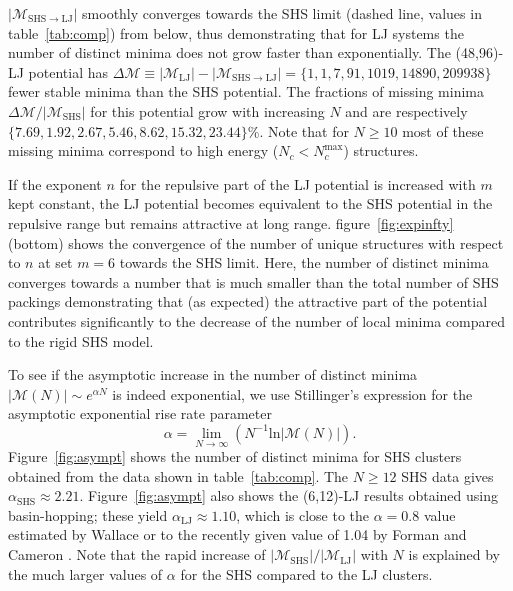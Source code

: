 $|\mathcal{M}_\mathrm{SHS\to LJ}|$ smoothly  converges towards the \ac{SHS} limit (dashed line, values in table~\ref{tab:comp}) from below, 
thus demonstrating that for LJ systems the number of distinct minima does not grow faster than exponentially.  
The (48,96)-LJ potential has $\Delta\mathcal{M} \equiv |\mathcal{M}_\mathrm{LJ}| - |\mathcal{M}_\mathrm{SHS\to LJ}| = \{1,1,7,91,1019,14890,209938\}$ fewer stable minima than the \ac{SHS} potential.
The fractions of missing minima $\Delta\mathcal{M}/|\mathcal{M}_\mathrm{SHS}|$ for this potential grow with increasing $N$ and are respectively $\{7.69,1.92,2.67,5.46,8.62,15.32,23.44\}\%$.  Note that for $N \geq 10$ most of these missing minima correspond to high energy ($N_c < N_c^\mathrm{max}$) structures.


If the exponent $n$ for the repulsive part of the LJ potential is increased
with $m$ kept constant, the LJ potential becomes equivalent to the \ac{SHS}
potential in the repulsive range but remains attractive at long range.
figure~\ref{fig:expinfty} (bottom) shows the convergence of the number of
unique structures with respect to $n$ at set $m=6$ towards the \ac{SHS} limit. Here, the
number of distinct minima converges towards a number that is much smaller
than the total number of \ac{SHS} packings demonstrating that (as expected) the
attractive part of the potential contributes significantly to the decrease of
the number of local minima compared to the rigid \ac{SHS} model.

To see if the asymptotic increase in the number of distinct minima $|\mathcal{M}(N)| \sim e^{\alpha N}$ 
is indeed exponential, we use Stillinger's expression for the asymptotic exponential rise rate parameter \autocite{Stillinger_Exponentialmultiplicityinherent_1999}
\begin{equation} \label{eq:Stil}
\alpha = \lim_{N\rightarrow \infty} \left( N^{-1} \mathrm{ln} |\mathcal{M}(N)| \right).
\end{equation}
Figure~\ref{fig:asympt} shows the number of distinct minima for \ac{SHS} clusters
obtained from the data shown in table~\ref{tab:comp}.  The $N \geq 12$ \ac{SHS} data
gives $\alpha_\mathrm{SHS}\approx 2.21$. Figure~\ref{fig:asympt} also shows the
(6,12)-LJ results obtained using basin-hopping; these yield
$\alpha_\mathrm{LJ}\approx 1.10$, which is close to the $\alpha=0.8$ value
estimated by Wallace \autocite{Wallace-1997} or to the recently given value of 1.04
by Forman and Cameron \autocite{Forman_ModelingAggregationProcesses_2017}.  Note that the rapid increase of
$|\mathcal{M}_\mathrm{SHS}|/|\mathcal{M}_\mathrm{LJ}|$ with $N$ is explained by
the much larger values of $\alpha$ for the \ac{SHS} compared to the LJ clusters.

